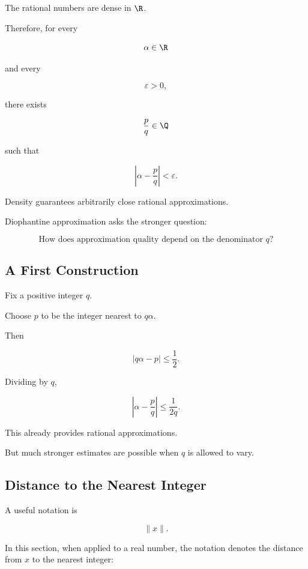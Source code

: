 The rational numbers are dense in \(\R\).

Therefore, for every

\[ \alpha\in\R \]

and every

\[ \varepsilon>0, \]

there exists

\[ \frac pq\in\Q \]

such that

\[ \left|\alpha-\frac pq\right|<\varepsilon. \]

Density guarantees arbitrarily close rational approximations.

Diophantine approximation asks the stronger question:

\[
\boxed{
\text{How does approximation quality depend on the denominator }q?
}
\]

\subsection{A First Construction}
\label{subsec:first-rational-approximation-construction}

Fix a positive integer \(q\).

Choose \(p\) to be the integer nearest to \(q\alpha\).

Then

\[ |q\alpha-p|\leq\frac12. \]

Dividing by \(q\),

\[ \left|\alpha-\frac pq\right|\leq\frac1{2q}. \]

This already provides rational approximations.

But much stronger estimates are possible when \(q\) is allowed to vary.

\subsection{Distance to the Nearest Integer}
\label{subsec:distance-nearest-integer}

A useful notation is

\[ \|x\|. \]

In this section, when applied to a real number, the notation denotes the
distance from \(x\) to the nearest integer:

